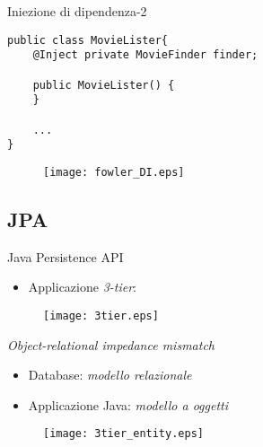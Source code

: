 \begin{frame}[fragile]{Iniezione di dipendenza-2}


\begin{lstlisting}[basicstyle={\tiny\ttfamily}]
public class MovieLister{
    @Inject private MovieFinder finder;
    
    public MovieLister() {
    }
    
    ...
}
\end{lstlisting}


\begin{figure}
	\centering
	\texttt{[image: fowler\_DI.eps]}
\end{figure}


\end{frame}




\subsection{JPA}
\begin{frame}{Java Persistence API}

\begin{itemize}
\item Applicazione \textsl{3-tier}:
\end{itemize}

\begin{figure}
	\centering
	\texttt{[image: 3tier.eps]}
\end{figure}

\end{frame}


\begin{frame}{\textsl{Object-relational impedance mismatch}}


\begin{itemize}

\vspace{0.4em}

\item Database: \textsl{modello relazionale}

\vspace{0.7em}

\item Applicazione Java: \textsl{modello a oggetti}

\end{itemize}

\begin{figure}
	\centering
	\texttt{[image: 3tier\_entity.eps]}
\end{figure}

\end{frame}




